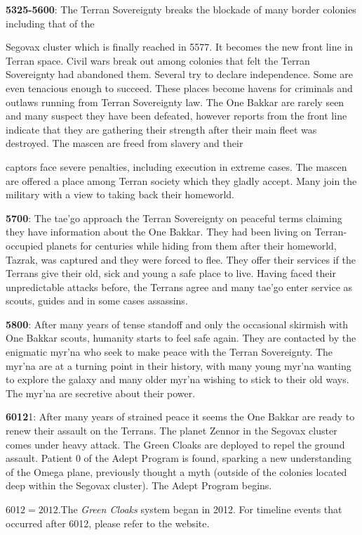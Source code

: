 \documentclass{scrbook}
\begin{document}
\textbf{5325-5600}: The Terran Sovereignty breaks the blockade of many border colonies including that of the

Segovax cluster which is finally reached in 5577. It becomes the new front line in Terran space. Civil wars break out among colonies that felt the Terran Sovereignty had abandoned them. Several try to declare independence. Some are even tenacious enough to succeed. These places become havens for criminals and outlaws running from Terran Sovereignty law. The One Bakkar are rarely seen and many suspect they have been defeated, however reports from the front line indicate that they are gathering their strength after their main fleet was destroyed. The mascen are freed from slavery and their

captors face severe penalties, including execution in extreme cases. The mascen are offered a place among Terran society which they gladly accept. Many join the military with a view to taking back their homeworld.

\textbf{5700}: The tae'go approach the Terran Sovereignty on peaceful terms claiming they have information about the One Bakkar. They had been living on Terran-occupied planets for centuries while hiding from them after their homeworld, Tazrak, was captured and they were forced to flee. They offer their services if the Terrans give their old, sick and young a safe place to live. Having faced their unpredictable attacks before, the Terrans agree and many tae'go enter service as scouts, guides and in some cases assassins.

\textbf{5800}: After many years of tense standoff and only the occasional skirmish with One Bakkar scouts, humanity starts to feel safe again. They are contacted by the enigmatic myr'na who seek to make peace with the Terran Sovereignty. The myr'na are at a turning point in their history, with many young myr'na wanting to explore the galaxy and many older myr'na wishing to stick to their old ways. The myr'na are secretive about their power.

\textbf{6012}1: After many years of strained peace it seems the One Bakkar are ready to renew their assault on the Terrans. The planet Zennor in the Segovax cluster comes under heavy attack. The Green Cloaks are deployed to repel the ground assault. Patient 0 of the Adept Program is found, sparking a new understanding of the Omega plane, previously thought a myth (outside of the colonies located deep within the Segovax cluster). The Adept Program begins.

601$2 = 2012. $The \textit{Green Cloaks} system began in 2012. For timeline events that occurred after 6012, please refer to the website.
\end{document}
